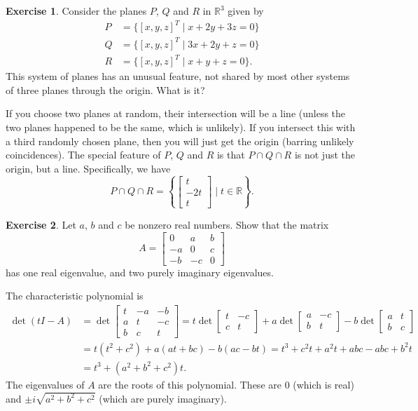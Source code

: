 \documentclass{amsart}
\newcommand{\R}         {{\mathbb{R}}}
\newcommand{\bbm}       {\left[\begin{matrix}}
\newcommand{\ebm}       {\end{matrix}\right]}
\newcommand{\bsm}       {\left[\begin{smallmatrix}}
\newcommand{\esm}       {\end{smallmatrix}\right]}
\newcommand{\st}        {\;|\;}
\renewcommand{\:}       {\colon}
\theoremstyle{definition}
\newtheorem{exercise}{Exercise}[section]
\renewenvironment{solution}{\SolutionAtEnd}{\endSolutionAtEnd}
\begin{document}
\begin{exercise}
 Consider the planes $P$, $Q$ and $R$ in $\R^3$ given by 
 \begin{align*}
  P &= \{ [x,y,z]^T \st x+2y+3z=0 \} \\
  Q &= \{ [x,y,z]^T \st 3x+2y+z=0 \} \\
  R &= \{ [x,y,z]^T \st x+y+z=0 \}.
 \end{align*}
 This system of planes has an unusual feature, not shared by
 most other systems of three planes through the origin.
 What is it? 
\end{exercise}
\begin{solution}
 If you choose two planes at random, their intersection will
 be a line (unless the two planes happened to be the same,
 which is unlikely).  If you intersect this with a third
 randomly chosen plane, then you will just get the origin
 (barring unlikely coincidences).  The special feature of
 $P$, $Q$ and $R$ is that $P\cap Q\cap R$ is not just the
 origin, but a line.  Specifically, we have
 \[ P\cap Q\cap R =
      \left\{\bsm t\\ -2t\\ t\esm \st t\in\R\right\}.
 \]
\end{solution}

\begin{exercise}\label{ex-antisym-spectrum}
 Let $a$, $b$ and $c$ be nonzero real numbers.  Show that
 the matrix
 \[ A = \bbm 0 & a & b \\ -a & 0 & c \\ -b & -c & 0 \ebm
 \]
 has one real eigenvalue, and two purely imaginary
 eigenvalues. 
\end{exercise}
\begin{solution}
 The characteristic polynomial is
 \begin{align*}
  \det(tI-A)
   &= \det\bsm t & -a & -b \\
               a & t & -c \\
               b & c & t \esm
    =  t \det\bsm t & -c \\ c & t \esm 
      +a \det\bsm a & -c \\ b & t \esm 
      -b \det\bsm a & t \\ b & c \esm \\
   &= t(t^2+c^2) +a(at+bc) -b(ac-bt) 
    = t^3 + c^2t + a^2t + abc - abc + b^2t \\
   &= t^3+(a^2+b^2+c^2)t.
 \end{align*}
 The eigenvalues of $A$ are the roots of this polynomial.
 These are $0$ (which is real) and $\pm i\sqrt{a^2+b^2+c^2}$
 (which are purely imaginary).
\end{solution}
\end{document}
